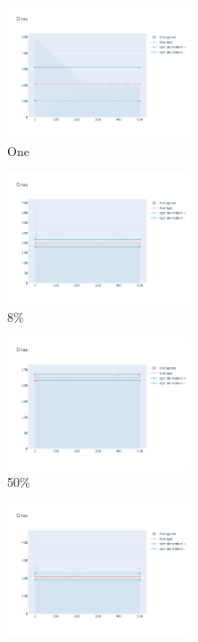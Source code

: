 \documentclass[12pt, fleqn]{report}                             %
\theoremstyle{break}                                            %
\begin{document}
      \begin{figure}[ht!]
        \centering
        \begin{subfigure}[b]{0.4\linewidth}
          \includegraphics[width=0.6\textwidth]{Images/73/dia-a.png}
          \caption{One}
        \end{subfigure}
        \begin{subfigure}[b]{0.4\linewidth}
          \includegraphics[width=0.6\textwidth]{Images/73/dia-b.png}
          \caption{8\%}
        \end{subfigure}
        \begin{subfigure}[b]{0.4\linewidth}
          \includegraphics[width=0.6\textwidth]{Images/73/dia-c.png}
          \caption{50\%}
        \end{subfigure}
        \begin{subfigure}[b]{0.4\linewidth}
          \includegraphics[width=0.6\textwidth]{Images/73/dia-d.png}

\end{subfigure}
\end{figure}
\end{document}
